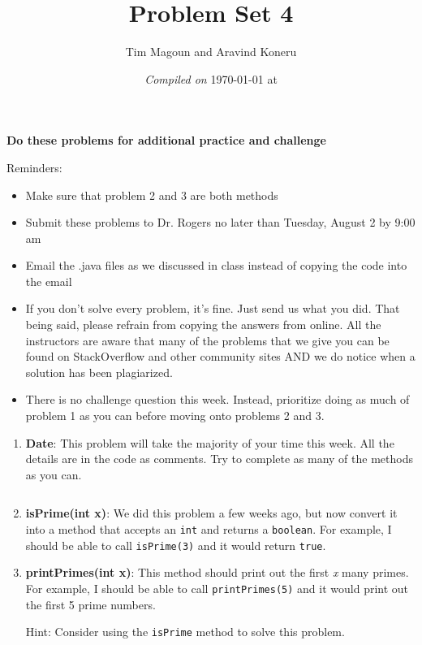 \documentclass[11pt,fleqn]{article}
\begin{document}
\title{Problem Set 4}%
\author{Tim Magoun and Aravind Koneru}
\date{\textit{Compiled on} \today \hspace{1mm} at \currenttime}
\maketitle

\begin{center}
\textbf{Do these problems for additional practice and challenge}
\end{center}

Reminders:
\begin{itemize}
    \item
        Make sure that problem 2 and 3 are both methods

    \item
        Submit these problems to Dr. Rogers no later than Tuesday, August 2 by 9:00 am

    \item
        Email the .java files as we discussed in class instead of copying the code into the email

    \item
        If you don't solve every problem, it's fine. Just send us what you did. That being said,
        please refrain from copying the answers from online. All the instructors are aware that many
        of the problems that we give you can be found on StackOverflow and other community sites AND
        we do notice when a solution has been plagiarized. 

    \item
        There is no challenge question this week. Instead, prioritize doing as much of problem 1 as
        you can before moving onto problems 2 and 3. 
\end{itemize}

\begin{enumerate}
    \item
        \textbf{Date}: This problem will take the majority of your time this week. All the details
        are in the code as comments. Try to complete as many of the methods as you can. 

        \inputminted{java}{../../src/ps_4/Date.java}

    \item
        \textbf{isPrime(int x)}: We did this problem a few weeks ago, but now convert it into a method that
        accepts an \texttt{int} and returns a \texttt{boolean}. For example, I should be able to
        call \texttt{isPrime(3)} and it would return \texttt{true}. 

    \item
        \textbf{printPrimes(int x)}: This method should print out the first \textit{x} many primes. 
        For example, I should be able to call \texttt{printPrimes(5)} and it would print out the first 5 
        prime numbers. 

        Hint: Consider using the \texttt{isPrime} method to solve this problem. 
\end{enumerate}
\end{document}

